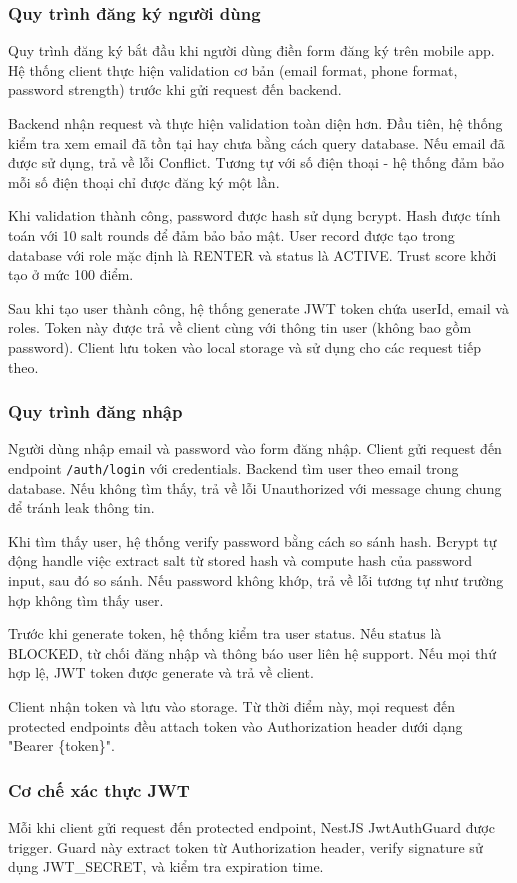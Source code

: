 \subsubsection{Quy trình đăng ký người dùng}
Quy trình đăng ký bắt đầu khi người dùng điền form đăng ký trên mobile app. Hệ thống client thực hiện validation cơ bản (email format, phone format, password strength) trước khi gửi request đến backend.

Backend nhận request và thực hiện validation toàn diện hơn. Đầu tiên, hệ thống kiểm tra xem email đã tồn tại hay chưa bằng cách query database. Nếu email đã được sử dụng, trả về lỗi Conflict. Tương tự với số điện thoại - hệ thống đảm bảo mỗi số điện thoại chỉ được đăng ký một lần.

Khi validation thành công, password được hash sử dụng bcrypt. Hash được tính toán với 10 salt rounds để đảm bảo bảo mật. User record được tạo trong database với role mặc định là RENTER và status là ACTIVE. Trust score khởi tạo ở mức 100 điểm.

Sau khi tạo user thành công, hệ thống generate JWT token chứa userId, email và roles. Token này được trả về client cùng với thông tin user (không bao gồm password). Client lưu token vào local storage và sử dụng cho các request tiếp theo.

\subsubsection{Quy trình đăng nhập}
Người dùng nhập email và password vào form đăng nhập. Client gửi request đến endpoint \texttt{/auth/login} với credentials. Backend tìm user theo email trong database. Nếu không tìm thấy, trả về lỗi Unauthorized với message chung chung để tránh leak thông tin.

Khi tìm thấy user, hệ thống verify password bằng cách so sánh hash. Bcrypt tự động handle việc extract salt từ stored hash và compute hash của password input, sau đó so sánh. Nếu password không khớp, trả về lỗi tương tự như trường hợp không tìm thấy user.

Trước khi generate token, hệ thống kiểm tra user status. Nếu status là BLOCKED, từ chối đăng nhập và thông báo user liên hệ support. Nếu mọi thứ hợp lệ, JWT token được generate và trả về client.

Client nhận token và lưu vào storage. Từ thời điểm này, mọi request đến protected endpoints đều attach token vào Authorization header dưới dạng "Bearer \{token\}".

\subsubsection{Cơ chế xác thực JWT}
Mỗi khi client gửi request đến protected endpoint, NestJS JwtAuthGuard được trigger. Guard này extract token từ Authorization header, verify signature sử dụng JWT\_SECRET, và kiểm tra expiration time.

